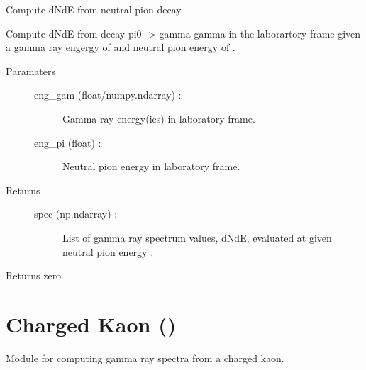 \documentclass[letterpaper,10pt,english]{sphinxmanual}
\begin{document}
\begin{fulllineitems}
\label{\detokenize{modules:hazma.neutral_pion.decay_spectra}}
Compute dNdE from neutral pion decay.

Compute dNdE from decay pi0 -\textgreater{} gamma gamma in the laborartory frame given
a gamma ray engergy of  and neutral pion energy of .
\begin{description}
\item[{Paramaters}] \leavevmode\begin{description}
\item[{eng\_gam (float/numpy.ndarray) :}] \leavevmode
Gamma ray energy(ies) in laboratory frame.

\item[{eng\_pi (float) :}] \leavevmode
Neutral pion energy in laboratory frame.

\end{description}

\item[{Returns}] \leavevmode\begin{description}
\item[{spec (np.ndarray) :}] \leavevmode
List of gamma ray spectrum values, dNdE, evaluated at
 given neutral pion energy .

\end{description}

\end{description}

\end{fulllineitems}


\begin{fulllineitems}
\label{\detokenize{modules:hazma.neutral_pion.fsr}}
Returns zero.

\end{fulllineitems}



\section{Charged Kaon ()}
\label{\detokenize{modules:module-hazma.charged_kaon}}\label{\detokenize{modules:charged-kaon-hazma-charged-kaon}}
Module for computing gamma ray spectra from a charged kaon.
\end{document}
